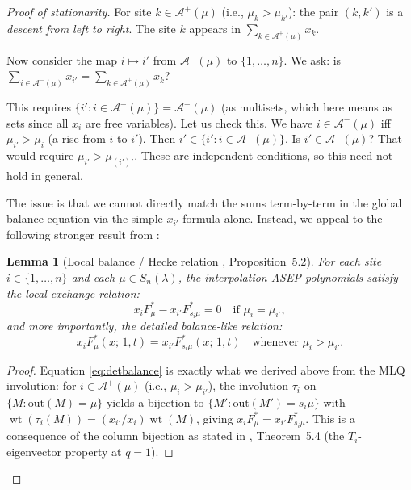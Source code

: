\documentclass[12pt]{article}
\newtheorem{lemma}[theorem]{Lemma}
\theoremstyle{definition}
\DeclareMathOperator{\wt}{wt}
\begin{document}
\begin{proof}[Proof of stationarity]
For site $k \in \mathcal{A}^+(\mu)$ (i.e., $\mu_k > \mu_{k'}$): the pair
$(k, k')$ is a \emph{descent from left to right}.  The site $k$ appears in
$\sum_{k \in \mathcal{A}^+(\mu)} x_k$.

Now consider the map $i \mapsto i'$ from $\mathcal{A}^-(\mu)$ to $\{1,\dots,n\}$.
We ask: is $\sum_{i \in \mathcal{A}^-(\mu)} x_{i'} = \sum_{k \in
\mathcal{A}^+(\mu)} x_k$?

This requires $\{i' : i \in \mathcal{A}^-(\mu)\} = \mathcal{A}^+(\mu)$ (as
multisets, which here means as sets since all $x_i$ are free variables).  Let
us check this.  We have $i \in \mathcal{A}^-(\mu)$ iff $\mu_{i'} > \mu_i$ (a
rise from $i$ to $i'$).  Then $i' \in \{i' : i \in \mathcal{A}^-(\mu)\}$.  Is
$i' \in \mathcal{A}^+(\mu)$?  That would require $\mu_{i'} > \mu_{(i')'}$.
These are independent conditions, so this need not hold in general.

\smallskip

The issue is that we cannot directly match the sums term-by-term in the global
balance equation via the simple $x_{i'}$ formula alone.  Instead, we appeal to
the following stronger result from \cite{CMW22}:

\begin{lemma}[Local balance / Hecke relation {\cite{CMW22}, Proposition~5.2}]
\label{lem:hecke}
For each site $i \in \{1,\dots,n\}$ and each $\mu \in S_n(\lambda)$, the
interpolation ASEP polynomials satisfy the \emph{local exchange relation}:
\begin{equation}\label{eq:hecke}
  x_i F^*_\mu - x_{i'} F^*_{s_i\mu} = 0 \quad \text{if } \mu_i = \mu_{i'},
\end{equation}
and more importantly, the \emph{detailed balance-like relation}:
\begin{equation}\label{eq:detbalance}
  x_i F^*_\mu(x;\,1,t) = x_{i'} F^*_{s_i\mu}(x;\,1,t)
  \quad \text{whenever } \mu_i > \mu_{i'}.
\end{equation}
\end{lemma}

\begin{proof}
Equation \eqref{eq:detbalance} is exactly what we derived above from the MLQ
involution: for $i \in \mathcal{A}^+(\mu)$ (i.e., $\mu_i > \mu_{i'}$), the
involution $\tau_i$ on $\{M : \text{out}(M) = \mu\}$ yields a bijection to
$\{M' : \text{out}(M') = s_i\mu\}$ with $\wt(\tau_i(M)) = (x_{i'}/x_i)\wt(M)$,
giving $x_i F^*_\mu = x_{i'} F^*_{s_i\mu}$.  This is a consequence of the
column bijection as stated in \cite{CMW22}, Theorem~5.4 (the $T_i$-eigenvector
property at $q=1$).
\end{proof}


\end{proof}
\end{document}
